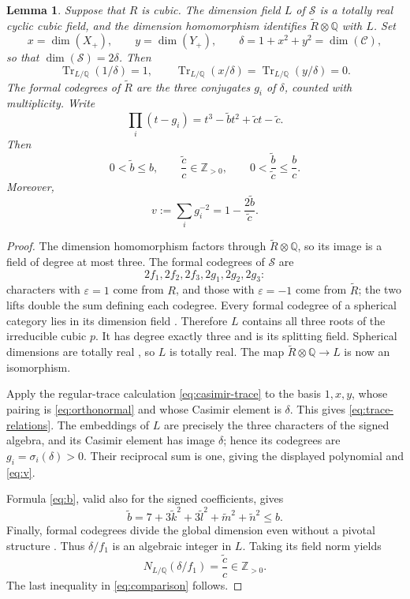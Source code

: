 \documentclass[11pt,a4paper]{article}
\newtheorem{lemma}[theorem]{Lemma}
\theoremstyle{definition}
\theoremstyle{remark}
\newcommand{\Q}{\mathbb Q}
\newcommand{\Z}{\mathbb Z}
\newcommand{\cC}{\mathcal C}
\newcommand{\cS}{\mathcal S}
\newcommand{\eps}{\varepsilon}
\newcommand{\Tr}{\operatorname{Tr}}
\numberwithin{equation}{section}
\begin{document}
\begin{lemma}\label{lem:field}
Suppose that $R$ is cubic. The dimension field $L$ of $\cS$ is a totally real cyclic cubic field, and the dimension homomorphism identifies $\widetilde R\otimes\Q$ with $L$. Set
\[
 x=\dim(X_+),\qquad y=\dim(Y_+),\qquad
 \delta=1+x^2+y^2=\dim(\cC),
\]
so that $\dim(\cS)=2\delta$. Then
\begin{equation}\label{eq:trace-relations}
 \Tr_{L/\Q}(1/\delta)=1,\qquad
 \Tr_{L/\Q}(x/\delta)=\Tr_{L/\Q}(y/\delta)=0.
\end{equation}
The formal codegrees of $\widetilde R$ are the three conjugates $g_i$ of $\delta$, counted with multiplicity. Write
\[
 \prod_i(t-g_i)=t^3-\widetilde b t^2+\widetilde c t-\widetilde c.
\]
Then
\begin{equation}\label{eq:comparison}
 0<\widetilde b\leq b,\qquad
 \frac{\widetilde c}{c}\in\Z_{>0},\qquad
 0<\frac{\widetilde b}{\widetilde c}\leq\frac bc.
\end{equation}
Moreover,
\begin{equation}\label{eq:v}
 v:=\sum_i g_i^{-2}=1-\frac{2\widetilde b}{\widetilde c}.
\end{equation}
\end{lemma}
\begin{proof}
The dimension homomorphism factors through $\widetilde R\otimes\Q$, so its image is a field of degree at most three. The formal codegrees of $\cS$ are
\begin{equation}\label{eq:six-codegrees}
 2f_1,2f_2,2f_3,2g_1,2g_2,2g_3:
\end{equation}
characters with $\eps=1$ come from $R$, and those with $\eps=-1$ come from $\widetilde R$; the two lifts double the sum defining each codegree. Every formal codegree of a spherical category lies in its dimension field \cite[Corollary~2.15]{Ostrik}. Therefore $L$ contains all three roots of the irreducible cubic $p$. It has degree exactly three and is its splitting field. Spherical dimensions are totally real \cite[Corollary~2.10]{ENO}, so $L$ is totally real. The map $\widetilde R\otimes\Q\to L$ is now an isomorphism.

Apply the regular-trace calculation \eqref{eq:casimir-trace} to the basis $1,x,y$, whose pairing is \eqref{eq:orthonormal} and whose Casimir element is $\delta$. This gives \eqref{eq:trace-relations}. The embeddings of $L$ are precisely the three characters of the signed algebra, and its Casimir element has image $\delta$; hence its codegrees are $g_i=\sigma_i(\delta)>0$. Their reciprocal sum is one, giving the displayed polynomial and \eqref{eq:v}.

Formula \eqref{eq:b}, valid also for the signed coefficients, gives
\[
 \widetilde b=7+3\widetilde k^2+3\widetilde l^2+
                    \widetilde m^2+\widetilde n^2\leq b.
\]
Finally, formal codegrees divide the global dimension even without a pivotal structure \cite[Corollary~2.14]{Ostrik}. Thus $\delta/f_1$ is an algebraic integer in $L$. Taking its field norm yields
\[
 N_{L/\Q}(\delta/f_1)=\frac{\widetilde c}{c}\in\Z_{>0}.
\]
The last inequality in \eqref{eq:comparison} follows.
\end{proof}
\end{document}
